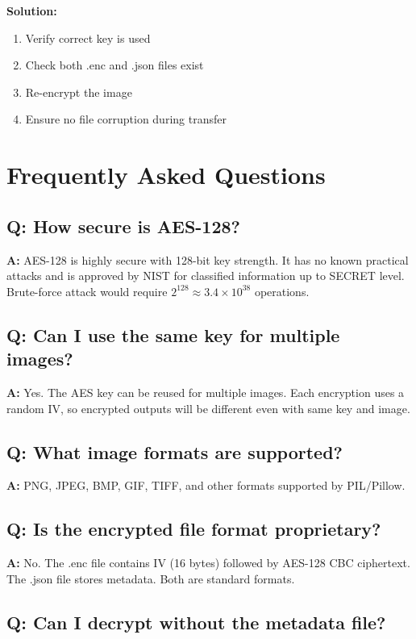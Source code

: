 \documentclass[12pt,a4paper]{report}
\begin{document}
\textbf{Solution:}
\begin{enumerate}
    \item Verify correct key is used
    \item Check both .enc and .json files exist
    \item Re-encrypt the image
    \item Ensure no file corruption during transfer
\end{enumerate}

\section{Frequently Asked Questions}

\subsection{Q: How secure is AES-128?}

\textbf{A:} AES-128 is highly secure with 128-bit key strength. It has no known practical attacks and is approved by NIST for classified information up to SECRET level. Brute-force attack would require $2^{128} \approx 3.4 \times 10^{38}$ operations.

\subsection{Q: Can I use the same key for multiple images?}

\textbf{A:} Yes. The AES key can be reused for multiple images. Each encryption uses a random IV, so encrypted outputs will be different even with same key and image.

\subsection{Q: What image formats are supported?}

\textbf{A:} PNG, JPEG, BMP, GIF, TIFF, and other formats supported by PIL/Pillow.

\subsection{Q: Is the encrypted file format proprietary?}

\textbf{A:} No. The .enc file contains IV (16 bytes) followed by AES-128 CBC ciphertext. The .json file stores metadata. Both are standard formats.

\subsection{Q: Can I decrypt without the metadata file?}
\end{document}
